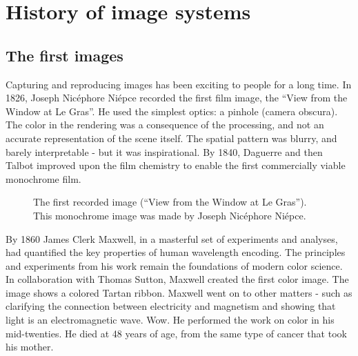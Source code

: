 \documentclass[
  letterpaper,
]{book}
\begin{document}
\section*{History of image systems}\label{history-of-image-systems}


\subsection*{The first images}\label{the-first-images}

Capturing and reproducing images has been exciting to people for a long
time. In 1826, Joseph Nicéphore Niépce recorded the first film image,
the ``View from the Window at Le Gras''. He used the simplest optics: a
pinhole (camera obscura). The color in the rendering was a consequence
of the processing, and not an accurate representation of the scene
itself. The spatial pattern was blurry, and barely interpretable - but
it was inspirational. By 1840, Daguerre and then Talbot improved upon
the film chemistry to enable the first commercially viable monochrome
film.

\begin{figure}


\caption{\label{fig-window-le-gras}The first recorded image (``View from
the Window at Le Gras''). This monochrome image was made by Joseph
Nicéphore Niépce.}

\end{figure}%

By 1860 James Clerk Maxwell, in a masterful set of experiments and
analyses, had quantified the key properties of human wavelength
encoding. The principles and experiments from his work remain the
foundations of modern color science. In collaboration with Thomas
Sutton, Maxwell created the first color image. The image shows a colored
Tartan ribbon. Maxwell went on to other matters - such as clarifying the
connection between electricity and magnetism and showing that light is
an electromagnetic wave. Wow. He performed the work on color in his
mid-twenties. He died at 48 years of age, from the same type of cancer
that took his mother.
\end{document}

